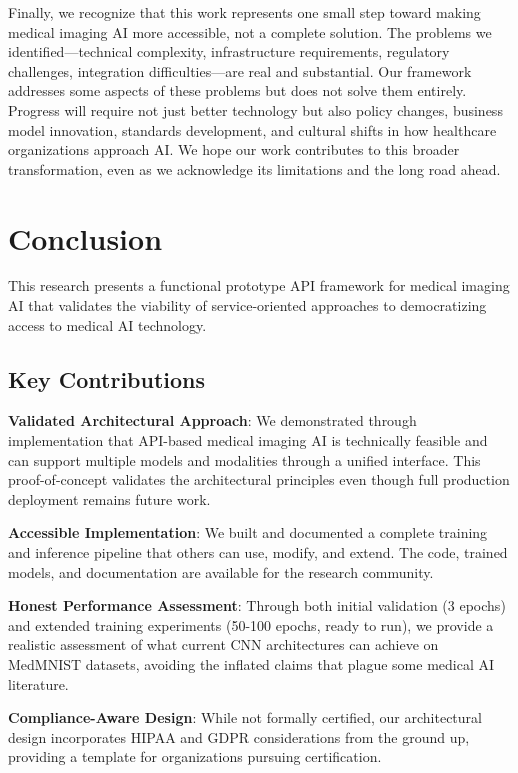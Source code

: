 \documentclass[12pt,a4paper]{article}
\begin{document}
Finally, we recognize that this work represents one small step toward making medical imaging AI more accessible, not a complete solution. The problems we identified—technical complexity, infrastructure requirements, regulatory challenges, integration difficulties—are real and substantial. Our framework addresses some aspects of these problems but does not solve them entirely. Progress will require not just better technology but also policy changes, business model innovation, standards development, and cultural shifts in how healthcare organizations approach AI. We hope our work contributes to this broader transformation, even as we acknowledge its limitations and the long road ahead.

\section{Conclusion}

This research presents a functional prototype API framework for medical imaging AI that validates the viability of service-oriented approaches to democratizing access to medical AI technology.

\subsection{Key Contributions}

\textbf{Validated Architectural Approach}: We demonstrated through implementation that API-based medical imaging AI is technically feasible and can support multiple models and modalities through a unified interface. This proof-of-concept validates the architectural principles even though full production deployment remains future work.

\textbf{Accessible Implementation}: We built and documented a complete training and inference pipeline that others can use, modify, and extend. The code, trained models, and documentation are available for the research community.

\textbf{Honest Performance Assessment}: Through both initial validation (3 epochs) and extended training experiments (50-100 epochs, ready to run), we provide a realistic assessment of what current CNN architectures can achieve on MedMNIST datasets, avoiding the inflated claims that plague some medical AI literature.

\textbf{Compliance-Aware Design}: While not formally certified, our architectural design incorporates HIPAA and GDPR considerations from the ground up, providing a template for organizations pursuing certification.
\end{document}
